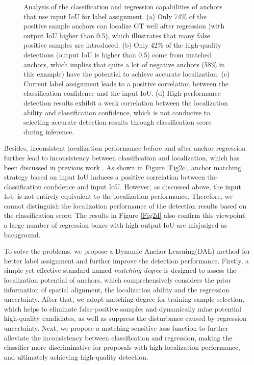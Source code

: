 \documentclass[letterpaper]{article} \usepackage{aaai21}  \usepackage{times}  \usepackage{helvet} \usepackage{courier}  \usepackage[hyphens]{url}  \usepackage{graphicx} \urlstyle{rm} \def\UrlFont{\rm}  \usepackage{natbib}  \usepackage{caption} \frenchspacing  \setlength{\pdfpagewidth}{8.5in}  \setlength{\pdfpageheight}{11in}  \usepackage{url}
\begin{document}
\begin{figure}[t]
	\hspace{-1mm}
	\hspace{3mm}
	\caption{Analysis of the classification and regression capabilities of anchors that use input IoU for label assignment. (a) Only 74\% of the positive sample anchors can localize GT well after regression (with output IoU higher than 0.5), which illustrates that many false positive samples are introduced. (b) Only 42\% of the high-quality detections (output IoU is higher than 0.5) come from matched anchors, which implies that quite a lot of negative anchors (58\% in this example) have the potential to achieve accurate localization. (c) Current label assignment leads to a positive correlation between the classification confidence and the input IoU. (d) High-performance detection results exhibit a weak correlation between the localization ability and classification confidence, which is not conducive to selecting accurate detection results through classification score during inference.}
	\label{fig2}
\end{figure}
Besides, inconsistent localization performance before and after anchor regression further lead to inconsistency between classification and localization, which has been discussed in previous work \cite{jiang2018acquisition, kong2019consistent, he2019bounding}. As shown in Figure \ref{Fig2c}, anchor matching strategy based on input IoU induces a positive correlation between the classification confidence and input IoU. However, as discussed above, the input IoU is not entirely equivalent to the localization performance. Therefore, we cannot distinguish the localization performance of the detection results based on the classification score. The results in Figure \ref{Fig2d} also confirm this viewpoint: a large number of regression boxes with high output IoU  are misjudged as background.

To solve the problems, we propose a Dynamic Anchor Learning(DAL) method for better label assignment and further improve the detection performance. Firstly, a simple yet effective standard named \textit{matching degree} is designed to assess the localization potential of anchors, which comprehensively considers the prior information of spatial alignment, the localization ability and the regression uncertainty. After that, we adopt matching degree for training sample selection, which helps to eliminate false-positive samples and dynamically mine potential high-quality candidates, as well as suppress the disturbance caused by regression uncertainty. Next, we propose a matching-sensitive loss function to further alleviate the inconsistency between classification and regression, making the classifier more discriminative for proposals with high localization performance, and ultimately achieving high-quality detection.
\end{document}

